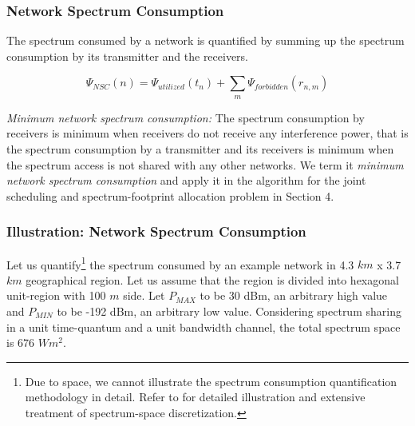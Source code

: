 \documentclass[12pt, draftclsnofoot, onecolumn]{IEEEtran}
\begin{document}
\subsubsection{Network Spectrum Consumption}

The spectrum consumed by a network is quantified by summing up the spectrum consumption by its transmitter and the receivers.

\begin{equation}
\label{eq:nsc}
\Psi_{NSC}(n) = \Psi_{utilized}(t_{n}) + \sum_m \Psi_{forbidden}(r_{n,m}) 
\end{equation}

\textit{Minimum network spectrum consumption:}
The spectrum consumption by receivers is minimum when receivers do not receive any interference power, that is the spectrum consumption by a transmitter and its receivers is minimum when the spectrum access is not shared with any other networks. We term it \textit{minimum network spectrum consumption} and apply it in the algorithm for the joint scheduling and spectrum-footprint allocation problem in Section 4.

\subsubsection{Illustration: Network Spectrum Consumption}
\label{illn_setup}
 
Let us quantify\footnote{Due to space, we cannot illustrate the spectrum consumption quantification methodology in detail. Refer to \cite{oms1_sl} for detailed illustration and extensive treatment of spectrum-space discretization.} the spectrum consumed by an example network in 4.3 $km$ x 3.7 $km$ geographical region. Let us assume that the region is divided into hexagonal unit-region with 100 $m$ side. Let $P_{MAX}$ to be 30 dBm, an arbitrary high value and $P_{MIN}$ to be -192 dBm, an arbitrary low value. Considering spectrum sharing in a unit time-quantum and a unit bandwidth channel, the total spectrum space is $676$ $Wm^2$. 
\end{document}
